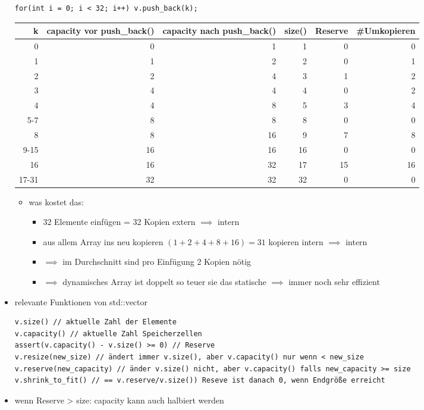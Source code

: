 \documentclass[a4paper]{scrartcl}
\theoremstyle{definition}
\theoremstyle{plain}
\theoremstyle{remark}
\theoremstyle{remark}
\begin{document}
\begin{itemize}
\begin{verbatim}
for(int i = 0; i < 32; i++) v.push_back(k);
\end{verbatim}
\begin{center}
\begin{tabular}{rrrrrr}
k & capacity vor push\_back() & capacity nach push\_back() & size() & Reserve & \#Umkopieren\\
\hline
0 & 0 & 1 & 1 & 0 & 0\\
1 & 1 & 2 & 2 & 0 & 1\\
\hline
2 & 2 & 4 & 3 & 1 & 2\\
3 & 4 & 4 & 4 & 0 & 2\\
\hline
4 & 4 & 8 & 5 & 3 & 4\\
5-7 & 8 & 8 & 8 & 0 & 0\\
\hline
8 & 8 & 16 & 9 & 7 & 8\\
9-15 & 16 & 16 & 16 & 0 & 0\\
\hline
16 & 16 & 32 & 17 & 15 & 16\\
17-31 & 32 & 32 & 32 & 0 & 0\\
\end{tabular}
\end{center}
\begin{itemize}
\item was kostet das:
\begin{itemize}
\item 32 Elemente einfügen = 32 Kopien extern $\implies$ intern
\item aus allem Array ins neu kopieren $(1 + 2 + 4 + 8 + 16) = 31$ kopieren intern $\implies$ intern
\item $\implies$ im Durchschnitt sind pro Einfügung 2 Kopien nötig
\item $\implies$ dynamisches Array ist doppelt so teuer sie das statische  $\implies$ immer noch sehr effizient
\end{itemize}
\end{itemize}
\item relevante Funktionen von std::vector
\begin{verbatim}
v.size() // aktuelle Zahl der Elemente
v.capacity() // aktuelle Zahl Speicherzellen
assert(v.capacity() - v.size() >= 0) // Reserve
v.resize(new_size) // ändert immer v.size(), aber v.capacity() nur wenn < new_size
v.reserve(new_capacity) // änder v.size() nicht, aber v.capacity() falls new_capacity >= size
v.shrink_to_fit() // == v.reserve/v.size()) Reseve ist danach 0, wenn Endgröße erreicht
\end{verbatim}
\item wenn Reserve > size: capacity kann auch halbiert werden

\end{itemize}
\end{document}
